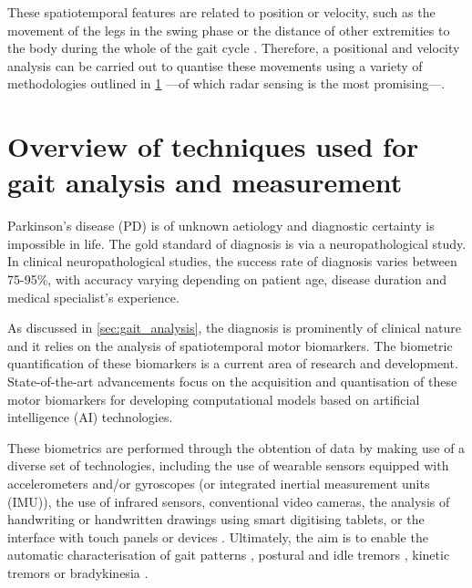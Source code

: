 	These spatiotemporal features are related to position or velocity, such as the movement of the legs in the swing phase or the distance of other extremities to the body during the whole of the gait cycle \cite{Biase2020}. Therefore, a positional and velocity analysis can be carried out to quantise these movements using a variety of methodologies outlined in \cref{sec:gait_methods} ---of which radar sensing is the most promising---.

	\section{Overview of techniques used for gait analysis and measurement} \label{sec:gait_methods}

	Parkinson's disease (PD) is of unknown aetiology and diagnostic certainty is impossible in life. The gold standard of diagnosis is via a neuropathological study. In clinical neuropathological studies, the success rate of diagnosis varies between 75-95\%, with accuracy varying depending on patient age, disease duration and medical specialist's experience.

	As discussed in \cref{sec:gait_analysis}, the diagnosis is prominently of clinical nature and it relies on the analysis of spatiotemporal motor biomarkers. The biometric quantification of these biomarkers is a current area of research and development. State-of-the-art advancements focus on the acquisition and quantisation of these motor biomarkers for developing computational models based on artificial intelligence (AI) technologies.

	These biometrics are performed through the obtention of data by making use of a diverse set of technologies, including the use of wearable sensors equipped with accelerometers and/or gyroscopes (or integrated inertial measurement units (IMU)), the use of infrared sensors, conventional video cameras, the analysis of handwriting or handwritten drawings using smart digitising tablets, or the interface with touch panels or devices \cite{Biase2020,Zanardi2021}. Ultimately, the aim is to enable the automatic characterisation of gait patterns \cite{Biase2020,Perumal2016}, postural and idle tremors \cite{Delrobaei2018}, kinetic tremors \cite{Rosenblum2013} or bradykinesia \cite{Mitsi2017}.

